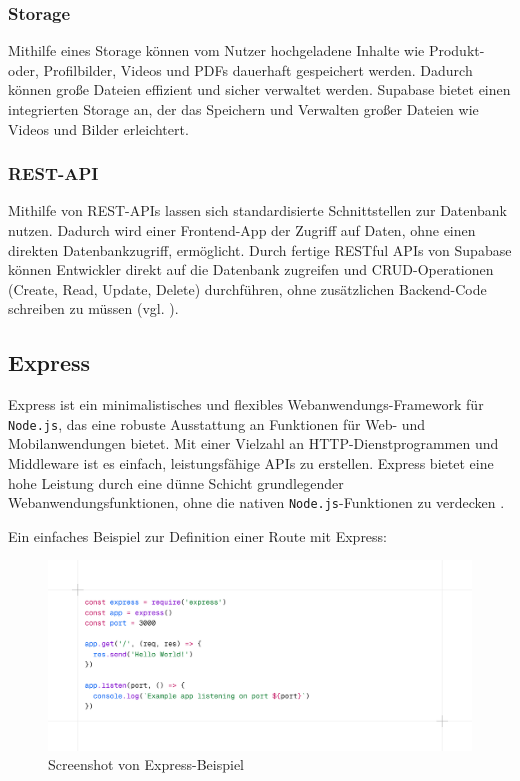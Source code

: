 \documentclass[oneside]{ausarbeitung}
\begin{document}
\subsubsection{Storage}
Mithilfe eines Storage können vom Nutzer hochgeladene Inhalte wie Produkt- oder, Profilbilder, Videos und PDFs dauerhaft gespeichert werden. Dadurch können große Dateien effizient und sicher verwaltet werden. 
Supabase bietet einen integrierten Storage an, der das Speichern und Verwalten großer Dateien wie Videos und Bilder erleichtert. 
\subsubsection{REST-API}
Mithilfe von REST-APIs lassen sich standardisierte Schnittstellen zur Datenbank nutzen. Dadurch wird einer Frontend-App der Zugriff auf Daten, ohne einen direkten Datenbankzugriff, ermöglicht. 
Durch fertige RESTful APIs von Supabase können Entwickler direkt auf die Datenbank zugreifen und CRUD-Operationen (Create, Read, Update, Delete) durchführen, ohne zusätzlichen Backend-Code schreiben zu müssen (vgl. \parencite{supabase}). 
\subsection{Express}

Express ist ein minimalistisches und flexibles Webanwendungs-Framework für \texttt{Node.js}, das eine robuste Ausstattung an Funktionen für Web- und Mobilanwendungen bietet. Mit einer Vielzahl an HTTP-Dienstprogrammen und Middleware ist es einfach, leistungsfähige APIs zu erstellen. Express bietet eine hohe Leistung durch eine dünne Schicht grundlegender Webanwendungsfunktionen, ohne die nativen \texttt{Node.js}-Funktionen zu verdecken \parencite{express-official}.  

Ein einfaches Beispiel zur Definition einer Route mit Express:  

\begin{figure}[H]
    \centering
    \includegraphics[width=\linewidth]{images/express.png}
    \caption{Screenshot von Express-Beispiel}
    \label{fig:rcheckout}
\end{figure}
\end{document}
